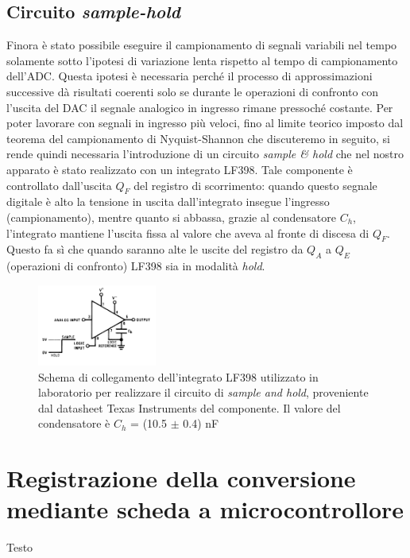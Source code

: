 \documentclass[journal]{IEEEtran}
\begin{document}
\subsection{Circuito \textit{sample-hold}}
Finora è stato possibile eseguire il campionamento di segnali variabili nel tempo solamente sotto l'ipotesi di variazione lenta rispetto al tempo di campionamento dell'ADC. Questa ipotesi è necessaria perché il processo di approssimazioni successive dà risultati coerenti solo se durante le operazioni di confronto con l'uscita del DAC il segnale analogico in ingresso rimane pressoché costante. Per poter lavorare con segnali in ingresso più veloci, fino al limite teorico imposto dal teorema del campionamento di Nyquist-Shannon che discuteremo in seguito, si rende quindi necessaria l'introduzione di un circuito \textit{sample \& hold} che nel nostro apparato è stato realizzato con un integrato LF398. Tale componente è controllato dall'uscita $Q_F$ del registro di scorrimento: quando questo segnale digitale è alto la tensione in uscita dall'integrato insegue l'ingresso (campionamento), mentre quanto si abbassa, grazie al condensatore $C_h$, l'integrato mantiene l'uscita fissa al valore che aveva al fronte di discesa di $Q_F$. Questo fa sì che quando saranno alte le uscite del registro da $Q_A$ a $Q_E$ (operazioni di confronto) LF398 sia in modalità \textit{hold}.


\begin{figure}[H]%
\begin{center}
\includegraphics[width=0.35\textwidth]{sch-simulations/digital/output/lf398.png}
\caption{Schema di collegamento dell'integrato LF398 utilizzato in laboratorio per realizzare il circuito di \textit{sample and hold}, proveniente dal datasheet Texas Instruments del componente. Il valore del condensatore è $C_h$ = (10.5 $\pm$ 0.4) nF}
\label{fig:circuit_sample_and_hold}
\end{center}
\end{figure}

\section{Registrazione della conversione mediante scheda a microcontrollore}
Testo
\end{document}
